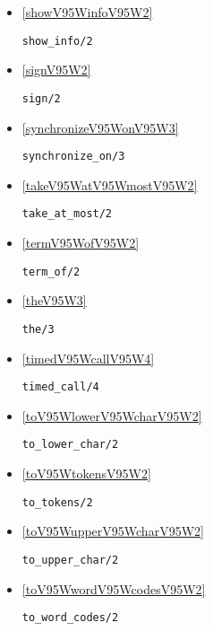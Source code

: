 \begin{itemize}
\item \ref{showV95WinfoV95W2} 
\begin{verbatim}
show_info/2
\end{verbatim}

\item \ref{signV95W2} 
\begin{verbatim}
sign/2
\end{verbatim}

\item \ref{synchronizeV95WonV95W3} 
\begin{verbatim}
synchronize_on/3
\end{verbatim}

\item \ref{takeV95WatV95WmostV95W2} 
\begin{verbatim}
take_at_most/2
\end{verbatim}

\item \ref{termV95WofV95W2} 
\begin{verbatim}
term_of/2
\end{verbatim}

\item \ref{theV95W3} 
\begin{verbatim}
the/3
\end{verbatim}

\item \ref{timedV95WcallV95W4} 
\begin{verbatim}
timed_call/4
\end{verbatim}

\item \ref{toV95WlowerV95WcharV95W2} 
\begin{verbatim}
to_lower_char/2
\end{verbatim}

\item \ref{toV95WtokensV95W2} 
\begin{verbatim}
to_tokens/2
\end{verbatim}

\item \ref{toV95WupperV95WcharV95W2} 
\begin{verbatim}
to_upper_char/2
\end{verbatim}

\item \ref{toV95WwordV95WcodesV95W2} 
\begin{verbatim}
to_word_codes/2
\end{verbatim}


\end{itemize}
